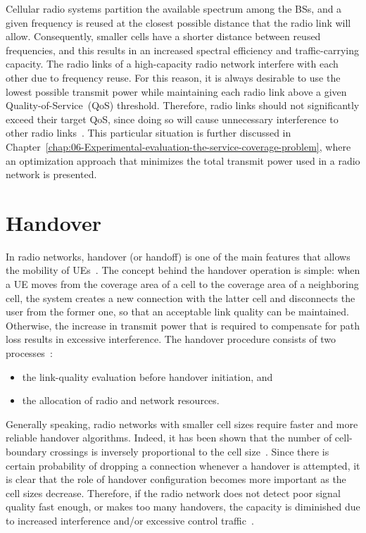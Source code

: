 Cellular radio systems partition the available spectrum among the
BSs, and a given frequency is reused at the closest possible distance
that the radio link will allow. Consequently, smaller cells have a
shorter distance between reused frequencies, and this results in an
increased spectral efficiency and traffic-carrying capacity. The radio
links of a high-capacity radio network interfere with each other due
to frequency reuse. For this reason, it is always desirable to use
the lowest possible transmit power while maintaining each radio link
above a given Quality-of-Service~(QoS)
threshold. Therefore, radio links should not significantly exceed
their target QoS, since doing so will cause unnecessary interference
to other radio links~\cite{Stuber-Principles_of_mobile_communication:2011}.
This particular situation is further discussed in Chapter~\ref{chap:06-Experimental-evaluation-the-service-coverage-problem},
where an optimization approach that minimizes the total transmit power
used in a radio network is presented.


\section{Handover \label{sub:02-Handover-and-soft-handover}}

In radio networks, handover (or handoff) is one of the main features
that allows the mobility of UEs~\cite{WCDMAforUMTS_RadioAccessForThirdGenerationMobileCommunications}.
The concept behind the handover operation is simple: when a UE moves
from the coverage area of a cell to the coverage area of a neighboring
cell, the system creates a new connection with the latter cell and
disconnects the user from the former one, so that an acceptable link
quality can be maintained. Otherwise, the increase in transmit power
that is required to compensate for path loss results in excessive
interference. The handover procedure consists of two processes~\cite{Stuber-Principles_of_mobile_communication:2011}:
\begin{itemize}
\item the link-quality evaluation before handover initiation, and
\item the allocation of radio and network resources.
\end{itemize}
Generally speaking, radio networks with smaller cell sizes require
faster and more reliable handover algorithms. Indeed, it has been
shown that the number of cell-boundary crossings is inversely proportional
to the cell size~\cite{Labedz-Handover_control_issues:1987}. Since
there is certain probability of dropping a connection whenever a handover
is attempted, it is clear that the role of handover configuration
becomes more important as the cell sizes decrease. Therefore, if the
radio network does not detect poor signal quality fast enough, or
makes too many handovers, the capacity is diminished due to increased
interference and/or excessive control traffic~\cite{Stuber-Principles_of_mobile_communication:2011}.


